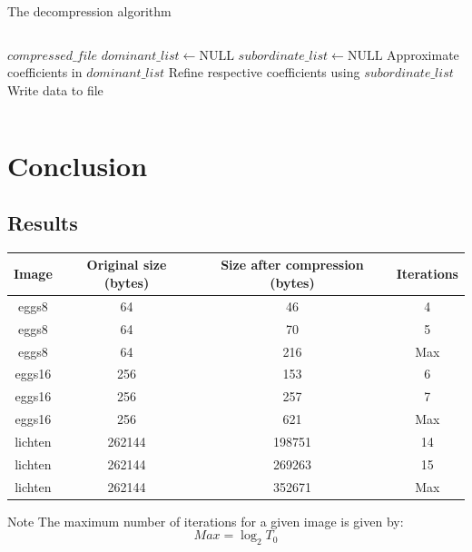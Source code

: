\documentclass{beamer}
\begin{document}
\begin{frame}{The decompression algorithm}
    \begin{columns}
        \begin{column}{\textwidth}
            \begin{algorithm}[H]
                \caption{EZW Decompression}
                \label{alg:ezwdecomp}
                \scriptsize
                \begin{algorithmic}
                    \Require $compressed\_file$
                    \State $dominant\_list \gets \text{NULL}$
                    \State $subordinate\_list \gets \text{NULL}$
                        \State Approximate coefficients in $dominant\_list$
                        \State Refine respective coefficients using $subordinate\_list$
                        \State Write data to file
                    \EndFor
                \end{algorithmic}
            \end{algorithm}
        \end{column}
    \end{columns}
\end{frame}

\section{Conclusion}
\subsection{Results}
\begin{frame}
    \begin{table}[H]
    \scriptsize
    \begin{tabular}{|c|c|c|c|}
        \hline
        \textbf{Image} & \textbf{Original size (bytes)} & \textbf{Size after
        compression (bytes)} & \textbf{Iterations}\\
        \hline
        eggs8 & 64 & 46 & 4\\
        eggs8 & 64 & 70 & 5\\
        eggs8 & 64 & 216 & Max\\
        \hline
        eggs16 & 256 & 153 & 6\\
        eggs16 & 256 & 257 & 7\\
        eggs16 & 256 & 621 & Max\\
        \hline
        lichten & 262144 & 198751 & 14\\
        lichten & 262144 & 269263 & 15\\
        lichten & 262144 & 352671 & Max\\
        \hline
    \end{tabular}
\end{table}

\begin{block}{Note}
    The maximum number of iterations for a given image is given by:
    $$Max = \log_2{T_0}$$
\end{block}
\end{frame}
\end{document}
